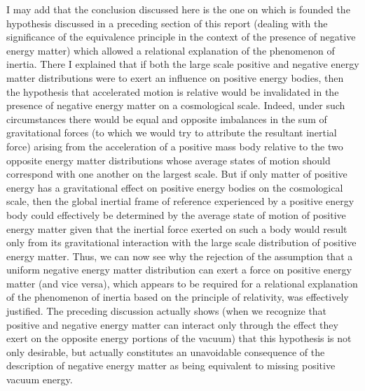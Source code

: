 \documentclass[notitlepage,12pt]{report}
\begin{document}
I may add that the conclusion discussed here is the one on which is founded the hypothesis discussed in a preceding section of this report (dealing with the significance of the equivalence principle in the context of the presence of negative energy matter) which allowed a relational explanation of the phenomenon of inertia. There I explained that if both the large scale positive and negative energy matter distributions were to exert an influence on positive energy bodies, then the hypothesis that accelerated motion is relative would be invalidated in the presence of negative energy matter on a cosmological scale. Indeed, under such circumstances there would be equal and opposite imbalances in the sum of gravitational forces (to which we would try to attribute the resultant inertial force) arising from the acceleration of a positive mass body relative to the two opposite energy matter distributions whose average states of motion should correspond with one another on the largest scale. But if only matter of positive energy has a gravitational effect on positive energy bodies on the cosmological scale, then the global inertial frame of reference experienced by a positive energy body could effectively be determined by the average state of motion of positive energy matter given that the inertial force exerted on such a body would result only from its gravitational interaction with the large scale distribution of positive energy matter. Thus, we can now see why the rejection of the assumption that a uniform negative energy matter distribution can exert a force on positive energy matter (and vice versa), which appears to be required for a relational explanation of the phenomenon of inertia based on the principle of relativity, was effectively justified. The preceding discussion actually shows (when we recognize that positive and negative energy matter can interact only through the effect they exert on the opposite energy portions of the vacuum) that this hypothesis is not only desirable, but actually constitutes an unavoidable consequence of the description of negative energy matter as being equivalent to missing positive vacuum energy.
\end{document}
